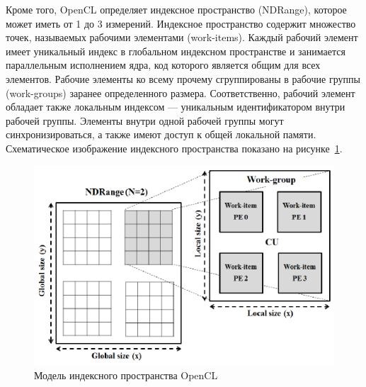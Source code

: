 Кроме того, OpenCL определяет индексное пространство (NDRange), которое может иметь от 1 до 3 измерений. Индексное пространство содержит множество точек, называемых рабочими элементами (work-items). Каждый рабочий элемент имеет уникальный индекс в глобальном индексном пространстве и занимается параллельным исполнением ядра, код которого является общим для всех элементов. Рабочие элементы ко всему прочему сгруппированы в рабочие группы (work-groups) заранее определенного размера. Соответственно, рабочий элемент обладает также локальным индексом --- уникальным идентификатором внутри рабочей группы. Элементы внутри одной рабочей группы могут синхронизироваться, а также имеют доступ к общей локальной памяти.  Схематическое изображение индексного пространства показано на рисунке~\ref{fig:opencl_sp}.

\begin{figure}[h!]
\centering
\includegraphics[scale=0.45]{pictures/The-index-space-of-OpenCL.png}
\caption{Модель индексного пространства OpenCL~\cite{ocl_sp}}
\label{fig:opencl_sp}
\end{figure}


